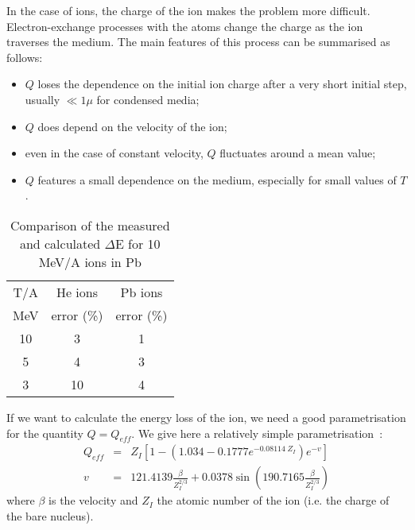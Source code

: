 In the case of ions, the charge of the ion makes the problem more difficult.
Electron-exchange processes with the atoms change the
charge as the ion traverses the medium. The main features of this 
process can be summarised as follows:
\begin{itemize}
\item $Q$ loses the dependence on the initial ion charge after a
very short initial step, usually $\ll 1\mu$ for condensed media;
\item $Q$ does depend on the velocity of the ion;
\item even in the case of constant velocity, $Q$ fluctuates around
a mean value;
\item $Q$ features a small dependence on the medium, especially for
small values of $T$.
\end{itemize}
\begin{table}
\begin{centering}
\begin{tabular}{|c|c|c|}
\hline
T/A & He ions & Pb ions \\
MeV & error (\%) & error (\%) \\
\hline
10 & 3 &  1 \\
5 & 4 & 3 \\
3 & 10 & 4 \\
\hline
\end{tabular}
\caption{Comparison of the measured and calculated $\Delta$E for 10 MeV/A
ions in Pb}
\end{centering}
\label{tb:phys431-1}
\end{table}

If we want to calculate the energy loss of the ion, we need a good
parametrisation for the quantity $Q=Q_{eff}$. We give here a 
relatively simple parametrisation~\cite{bib-ANZI,bib-ANZ1}:
\begin{eqnarray}
\label{eq:phys431-2}
Q_{eff} & = & Z_{I} \left [ 1- \left ( 1.034 - 0.1777 e^{-0.08114\;Z_{I}}
\right ) e^{-v} \right ] \\
v & = & 121.4139 \frac{\beta}{Z_{I}^{2/3}} + 0.0378
\sin \left ( 190.7165 \frac{\beta}{Z_{I}^{2/3}} \right ) \nonumber
\end{eqnarray}
where $\beta$ is the velocity and $Z_{I}$ the atomic number of the ion
(i.e. the charge of the bare nucleus).

